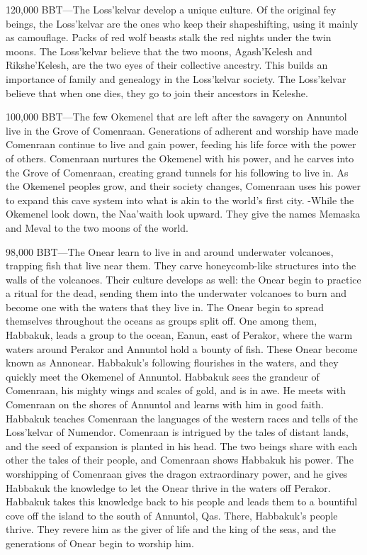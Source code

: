 \documentclass[smalldemyvopaper,11pt,twoside,onecolumn,openright,extrafontsizes]{memoir}
\begin{document}
120,000 BBT—The Loss’kelvar develop a unique culture. Of the original fey beings, the Loss’kelvar are the ones who keep their shapeshifting, using it mainly as camouflage. Packs of red wolf beasts stalk the red nights under the twin moons. The Loss’kelvar believe that the two moons, Agash’Kelesh and Rikshe’Kelesh, are the two eyes of their collective ancestry. This builds an importance of family and genealogy in the Loss’kelvar society. The Loss’kelvar believe that when one dies, they go to join their ancestors in Keleshe.

100,000 BBT—The few Okemenel that are left after the savagery on Annuntol live in the Grove of Comenraan. Generations of adherent and worship have made Comenraan continue to live and gain power, feeding his life force with the power of others. Comenraan nurtures the Okemenel with his power, and he carves into the Grove of Comenraan, creating grand tunnels for his following to live in. As the Okemenel peoples grow, and their society changes, Comenraan uses his power to expand this cave system into what is akin to the world’s first city.
-While the Okemenel look down, the Naa’waith look upward. They give the names Memaska and Meval to the two moons of the world.

98,000 BBT—The Onear learn to live in and around underwater volcanoes, trapping fish that live near them. They carve honeycomb-like structures into the walls of the volcanoes. Their culture develops as well: the Onear begin to practice a ritual for the dead, sending them into the underwater volcanoes to burn and become one with the waters that they live in. The Onear begin to spread themselves throughout the oceans as groups split off. One among them, Habbakuk, leads a group to the ocean, Eanun, east of Perakor, where the warm waters around Perakor and Annuntol hold a bounty of fish. These Onear become known as Annonear. Habbakuk’s following flourishes in the waters, and they quickly meet the Okemenel of Annuntol. Habbakuk sees the grandeur of Comenraan, his mighty wings and scales of gold, and is in awe. He meets with Comenraan on the shores of Annuntol and learns with him in good faith. Habbakuk teaches Comenraan the languages of the western races and tells of the Loss’kelvar of Numendor. Comenraan is intrigued by the tales of distant lands, and the seed of expansion is planted in his head. The two beings share with each other the tales of their people, and Comenraan shows Habbakuk his power. The worshipping of Comenraan gives the dragon extraordinary power, and he gives Habbakuk the knowledge to let the Onear thrive in the waters off Perakor. Habbakuk takes this knowledge back to his people and leads them to a bountiful cove off the island to the south of Annuntol, Qas. There, Habbakuk’s people thrive. They revere him as the giver of life and the king of the seas, and the generations of Onear begin to worship him.
\end{document}
